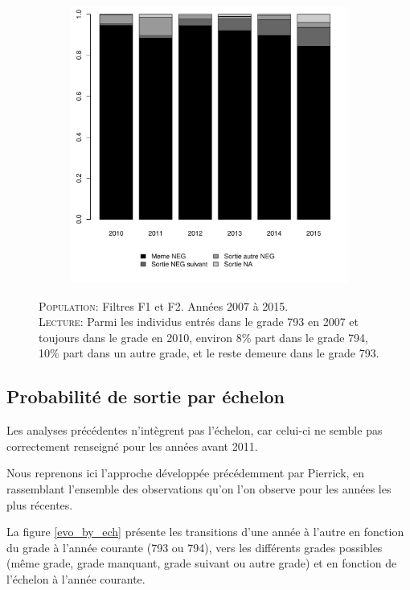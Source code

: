 \documentclass[11pt,a4paper]{article}
\begin{document}
\begin{figure}[ht]
\begin{subfigure}[b]{0.5\linewidth}
    \includegraphics[width=1\linewidth]{AT_destination_2009.pdf}  
    \end{subfigure}
    \begin{minipage}{12cm}
\footnotesize
\textsc{Population:} Filtres F1 et F2. Années 2007 à 2015. \\
\textsc{Lecture:} Parmi les individus entrés dans le grade 793 en 2007 et toujours dans le grade en 2010, environ 8\% part dans le grade 794, 10\% part dans un autre grade,  et le reste demeure dans le grade 793. 
\end{minipage}
\end{figure}




\clearpage
\subsection{Probabilité de sortie par échelon}

Les analyses précédentes n'intègrent pas l'échelon, car celui-ci ne semble pas correctement renseigné pour les années avant 2011.

Nous reprenons ici l'approche développée précédemment par Pierrick, en rassemblant l'ensemble des observations qu'on l'on observe pour les années les plus récentes. 

La figure \ref{evo_by_ech} présente les transitions d'une année à l'autre en fonction du grade à l'année courante (793 ou 794), vers les différents grades possibles (même grade, grade manquant, grade suivant ou autre grade) et en fonction de l'échelon à l'année courante. 
\end{document}
